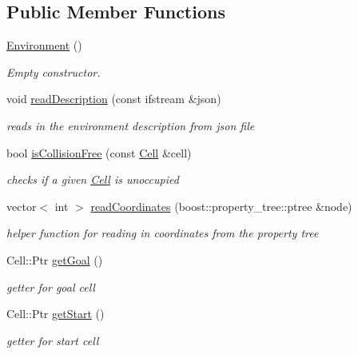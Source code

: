\subsection*{\-Public \-Member \-Functions}
\begin{DoxyCompactItemize}
\item 
\hypertarget{class_environment_a8b427c4448d8b7536666837521b9e83d}{\hyperlink{class_environment_a8b427c4448d8b7536666837521b9e83d}{\-Environment} ()}\label{class_environment_a8b427c4448d8b7536666837521b9e83d}

\begin{DoxyCompactList}\small\item\em \-Empty constructor. \end{DoxyCompactList}\item 
void \hyperlink{class_environment_a79909fe4c211b4cf8de7108fe4b01946}{read\-Description} (const ifstream \&json)
\begin{DoxyCompactList}\small\item\em reads in the environment description from json file \end{DoxyCompactList}\item 
bool \hyperlink{class_environment_a3c7c3a42c761f7b44a65cd54df53aee6}{is\-Collision\-Free} (const \hyperlink{struct_cell}{\-Cell} \&cell)
\begin{DoxyCompactList}\small\item\em checks if a given \hyperlink{struct_cell}{\-Cell} is unoccupied \end{DoxyCompactList}\item 
vector$<$ int $>$ \hyperlink{class_environment_a51c86c03c10f50b7fc366b134d66fdae}{read\-Coordinates} (boost\-::property\-\_\-tree\-::ptree \&node)
\begin{DoxyCompactList}\small\item\em helper function for reading in coordinates from the property tree \end{DoxyCompactList}\item 
\-Cell\-::\-Ptr \hyperlink{class_environment_a1eb91b74ba211896d9de8ac89da308ef}{get\-Goal} ()
\begin{DoxyCompactList}\small\item\em getter for goal cell \end{DoxyCompactList}\item 
\-Cell\-::\-Ptr \hyperlink{class_environment_adb44973d4cd3252e64e1c225c87ecd36}{get\-Start} ()
\begin{DoxyCompactList}\small\item\em getter for start cell \end{DoxyCompactList}\item 

\end{DoxyCompactItemize}
